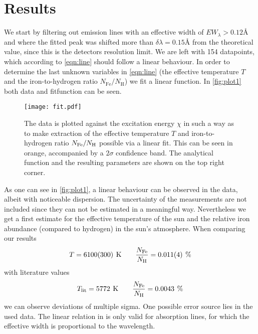 \section{Results}
We start by filtering out emission lines with an effective width of $EW_\lambda > 0.12 \unit{\angstrom}$ and where the fitted peak was shifted more than $\delta\lambda = 0.15 \unit{\angstrom}$ from the theoretical value, since this is the detectors resolution limit. We are left with 154 datapoints, which according to \autoref{eqn:line} should follow a linear behaviour. In order to determine the last unknown variables in \autoref{eqn:line} (the effective temperature $T$ and the iron-to-hydrogen ratio $N_{\text{Fe}}/N_{\text{H}}$) we fit a linear function. In \autoref{fig:plot1} both data and fitfunction can be seen. 

\begin{figure}[H]
	\centering
	\texttt{[image: fit.pdf]}
	\caption{The data is plotted against the excitation energy $\chi$ in such a way as to make extraction of the effective temperature $T$ and iron-to-hydrogen ratio $N_{\text{Fe}}/N_{\text{H}}$ possible via a linear fit. This can be seen in orange, accompanied by a $2\sigma$ confidence band. The analytical function and the resulting parameters are shown on the top right corner.}
	\label{fig:plot1}
\end{figure}

As one can see in \autoref{fig:plot1}, a linear behaviour can be observed in the data, albeit with noticeable dispersion. The uncertainty of the measurements are not included since they can not be estimated in a meaningful way. Nevertheless we get a first estimate for the effective temperature of the sun and the relative iron abundance (compared to hydrogen) in the sun's atmosphere. When comparing our results
\[ T = 6100(300) \unit{K} \qquad \frac{\NFe}{\NH} = 0.011(4) \unit{\percent} \]
with literature values \autocite{NASA}
\[ T_{\text{lit}} = 5772 \unit{K} \qquad \frac{\NFe}{\NH} = 0.0043 \unit{\percent} \]
we can observe deviations of multiple sigma. One possible error source lies in the used data. The linear relation in is only valid for absorption lines, for which the effective width is proportional to the wavelength. 

